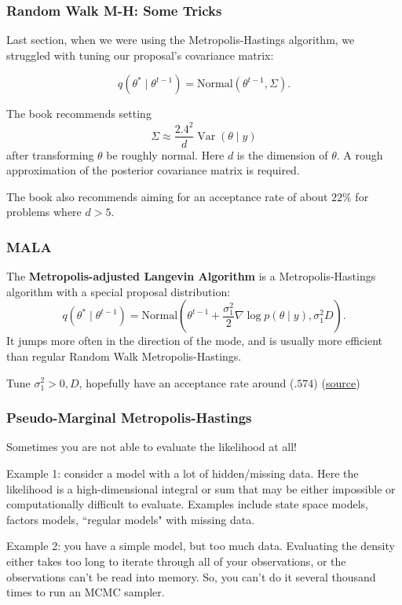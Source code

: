 \documentclass{beamer}
\begin{document}
\begin{frame}
\frametitle{Random Walk M-H: Some Tricks}

Last section, when we were using the Metropolis-Hastings algorithm, we struggled with tuning our proposal's covariance matrix:

$$
q(\theta^* \mid \theta^{t-1}) = \text{Normal}(\theta^{t-1}, \Sigma).
$$

The book recommends setting 
$$
\Sigma \approx \frac{2.4^2}{d} \operatorname{Var}(\theta \mid y)
$$
after transforming $\theta$ be roughly normal. Here $d$ is the dimension of $\theta$. A rough approximation of the posterior covariance matrix is required.
\newline

The book also recommends aiming for an acceptance rate of about $22\%$ for problems where $d > 5$. 


\end{frame}

\begin{frame}
\frametitle{MALA}

The {\bf Metropolis-adjusted Langevin Algorithm} is a Metropolis-Hastings algorithm with a special proposal distribution:
$$
q(\theta^* \mid \theta^{t-1}) = \text{Normal}(\theta^{t-1} + \frac{\sigma_1^2}{2} \nabla \log p(\theta \mid y) , \sigma_1^2 D).
$$
It jumps more often in the direction of the mode, and is usually more efficient than regular Random Walk Metropolis-Hastings.
\newline

Tune $\sigma_1^2 >0, D$, hopefully have an acceptance rate around ($.574$) (\href{https://pdfs.semanticscholar.org/b410/3e9b1d7e1699dd0d606b08c34394e2aff72d.pdf}{source})


\end{frame}

\begin{frame}[fragile]
\frametitle{Pseudo-Marginal Metropolis-Hastings}

Sometimes you are not able to evaluate the likelihood at all! 
\newline

Example 1: consider a model with a lot of hidden/missing data. Here the likelihood is a high-dimensional integral or sum that may be either impossible or computationally difficult to evaluate. Examples include state space models, factors models, ``regular models" with missing data.
\newline
\pause

Example 2: you have a simple model, but too much data. Evaluating the density either takes too long to iterate through all of your observations, or the observations can't be read into memory. So, you can't do it several thousand times to run an MCMC sampler. 

\end{frame}
\end{document}
